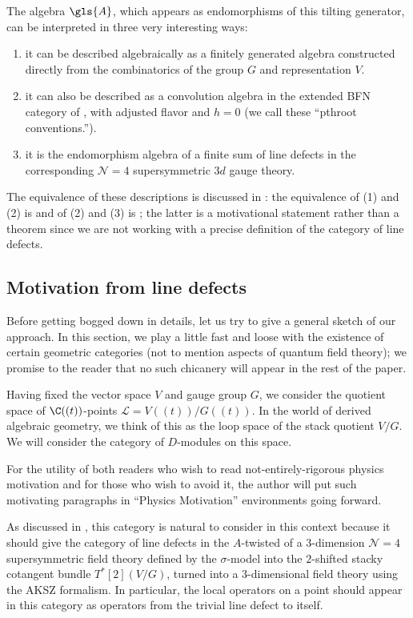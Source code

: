 The algebra $\gls{A}$,
which appears as endomorphisms of this tilting generator, can be
interpreted in three very interesting ways:
\begin{enumerate}
\item it can be described algebraically  as a finitely generated algebra constructed directly from the combinatorics of the group $G$ and representation $V$.
\item it can also be described as a convolution algebra in the
  extended BFN category of \cite{WebSD}, with adjusted flavor and $h=0$ (we
  call these ``\gls{pthroot} conventions.'').
\item it is the endomorphism algebra of a finite sum of line
  defects in the corresponding $\mathcal{N}=4$ supersymmetric $3d$
  gauge theory.
\end{enumerate}
The equivalence of these descriptions is discussed in \cite{WebSD}:
the equivalence of (1) and (2) is \cite[Th. 3.12]{WebSD} and of (2)
and (3) is \cite[Rem. 3.6]{WebSD};  the latter is a motivational
statement rather than a theorem since we are not working with a
precise definition of the category of line defects.

\subsection{Motivation from line defects}
\label{sec:motivation-from-line}

Before getting bogged down in details, let us try to give a general
sketch of our approach.  In this section, we play a little fast and
loose with the existence of certain geometric categories (not to
mention aspects of quantum field theory); we promise to the reader
that no such chicanery will appear in the rest of the paper.

Having fixed the vector space $V$ and gauge
group $G$, we consider the quotient space of $\C((t))$-points
$\mathcal{L}=V((t))/G((t))$.  In the world of derived algebraic geometry, we think
of this as the loop space of the stack quotient $V/G$.  We will
consider the category of $D$-modules on this space.

  For the utility of both readers who  wish to read
  not-entirely-rigorous physics motivation and for those who wish to avoid it,
  the author will put such motivating paragraphs in ``Physics
  Motivation'' environments going forward.
 \begin{physics}  As discussed in \cite[\S 1.1]{DGGH}, 
  this category is natural to consider in this context because it
  should give the category of line defects in the $A$-twisted of a 3-dimension
  $\mathcal{N}=4$ supersymmetric field theory defined by the
  $\sigma$-model into the $2$-shifted stacky cotangent bundle
  $T^*[2](V/G)$, turned into a 3-dimensional field theory using the
  AKSZ formalism.  In particular, the local operators on a point
  should appear in this category as operators from the trivial line
  defect to itself.
\end{physics}

